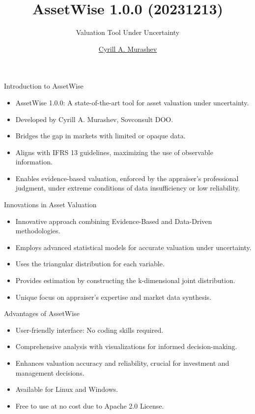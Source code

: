 \documentclass{beamer}
\title{AssetWise 1.0.0 (20231213)}
\subtitle{Valuation Tool Under Uncertainty}
\author{\href{https://github.com/Kirill-Murashev}{Cyrill A. Murashev}}
\institute{\href{https//sovconsult.tech}{Sovconsult DOO}, \href{https://en.wikipedia.org/wiki/Herceg_Novi}{Herzeg Novi}}
\begin{document}
\begin{frame}[plain]
    \maketitle
\end{frame}

\begin{frame}{Introduction to AssetWise}
	\begin{itemize}
		\item AssetWise 1.0.0: A state-of-the-art tool for asset valuation under uncertainty.
		\item Developed by Cyrill A. Murashev, Sovconsult DOO.
		\item Bridges the gap in markets with limited or opaque data.
		\item Aligns with IFRS 13 guidelines, maximizing the use of observable information.
		\item Enables evidence-based valuation, enforced by the appraiser's professional judgment, under extreme conditions of data insufficiency or low reliability.
	\end{itemize}
\end{frame}

\begin{frame}{Innovations in Asset Valuation}
	\begin{itemize}
		\item Innovative approach combining Evidence-Based and Data-Driven methodologies.
		\item Employs advanced statistical models for accurate valuation under uncertainty.
		\item Uses the triangular distribution for each variable.
		\item Provides estimation by constructing the k-dimensional joint distribution.
		\item Unique focus on appraiser's expertise and market data synthesis.
	\end{itemize}
\end{frame}

\begin{frame}{Advantages of AssetWise}
	\begin{itemize}
		\item User-friendly interface: No coding skills required.
		\item Comprehensive analysis with visualizations for informed decision-making.
		\item Enhances valuation accuracy and reliability, crucial for investment and management decisions.
		\item Available for Linux and Windows.
		\item Free to use at no cost due to Apache 2.0 License.
	\end{itemize}
\end{frame}
\end{document}
